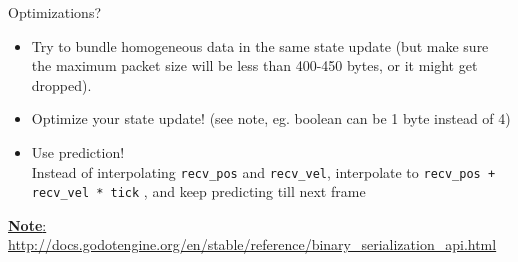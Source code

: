 \begin{frame}{Optimizations?}

\begin{itemize}
    \item Try to bundle homogeneous data in the same state update (but make sure the maximum packet size will be less than 400-450 bytes, or it might get dropped).
    \item Optimize your state update! (see note, eg. boolean can be 1 byte instead of 4)
    \item Use prediction! \\
    \footnotesize{Instead of interpolating \texttt{recv\_pos} and \texttt{recv\_vel}, interpolate to \texttt{recv\_pos + recv\_vel * tick} , and keep predicting till next frame}
\end{itemize}


\href{http://docs.godotengine.org/en/stable/reference/binary_serialization_api.html}{\tiny{\textbf{Note}: http://docs.godotengine.org/en/stable/reference/binary\_serialization\_api.html}}

\end{frame}